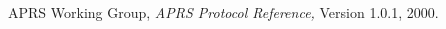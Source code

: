 \documentclass[conference,compsoc]{IEEEtran}
\begin{document}







%
%
%
\begin{thebibliography}{1}

APRS Working Group, \emph{APRS Protocol Reference,} Version 1.0.1, 2000.

\end{thebibliography}




\end{document}
